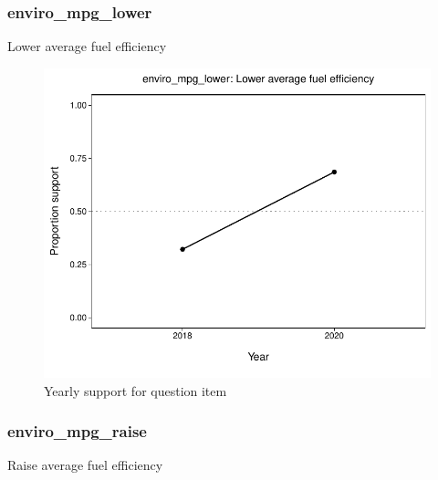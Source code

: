 \documentclass[
  12pt]{article}
\begin{document}
\hypertarget{enviro_mpg_lower}{%
\subsubsection{enviro\_mpg\_lower}\label{enviro_mpg_lower}}

Lower average fuel efficiency

\begin{figure}

{\centering \includegraphics{error-checking_files/figure-latex/unnamed-chunk-3-9} 

}

\caption{Yearly support for question item}\label{fig:unnamed-chunk-3-9}
\end{figure}

\hypertarget{enviro_mpg_raise}{%
\subsubsection{enviro\_mpg\_raise}\label{enviro_mpg_raise}}

Raise average fuel efficiency
\end{document}
